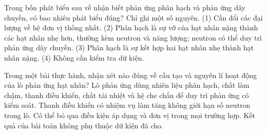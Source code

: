 \begin{ex}
Trong bốn phát biểu sau về nhận biết phản ứng phân hạch và phản ứng dây chuyền, có bao nhiêu phát biểu đúng? Chỉ ghi một số nguyên. (1) Cần đổi các đại lượng về hệ đơn vị thống nhất. (2) Phân hạch là sự vỡ của hạt nhân nặng thành các hạt nhân nhẹ hơn, thường kèm neutron và năng lượng; neutron có thể duy trì phản ứng dây chuyền. (3) Phân hạch là sự kết hợp hai hạt nhân nhẹ thành hạt nhân nặng. (4) Không cần kiểm tra dữ kiện.
\end{ex}

\begin{ex}
Trong một bài thực hành, nhận xét nào đúng về cấu tạo và nguyên lí hoạt động của lò phản ứng hạt nhân?
\choice
{\True Lò phản ứng dùng nhiên liệu phân hạch, chất làm chậm, thanh điều khiển, chất tải nhiệt và hệ che chắn để duy trì phản ứng có kiểm soát.}
{Thanh điều khiển có nhiệm vụ làm tăng không giới hạn số neutron trong lò.}
{Có thể bỏ qua điều kiện áp dụng và đơn vị trong mọi trường hợp.}
{Kết quả của bài toán không phụ thuộc dữ kiện đã cho.}
\end{ex}

